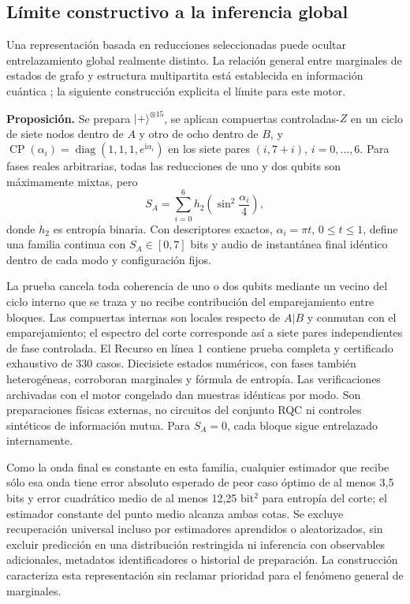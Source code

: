 \documentclass[pdflatex,iicol,sn-basic,Numbered]{sn-jnl}
\begin{document}
\subsection{Límite constructivo a la inferencia global}\label{sec:nogo}
Una representación basada en reducciones seleccionadas puede ocultar entrelazamiento global realmente distinto. La relación general entre marginales de estados de grafo y estructura multipartita está establecida en información cuántica \citep{Hein2004,Vandre2025}; la siguiente construcción explicita el límite para este motor.

\textbf{Proposición.} Se prepara $|+\rangle^{\otimes15}$, se aplican compuertas controladas-$Z$ en un ciclo de siete nodos dentro de $A$ y otro de ocho dentro de $B$, y $\operatorname{CP}(\alpha_i)=\operatorname{diag}(1,1,1,e^{\mathrm i\alpha_i})$ en los siete pares $(i,7+i)$, $i=0,\ldots,6$. Para fases reales arbitrarias, todas las reducciones de uno y dos qubits son máximamente mixtas, pero
\begin{equation}
S_A=\sum_{i=0}^{6}h_2\left(\sin^2\frac{\alpha_i}{4}\right),
\end{equation}
donde $h_2$ es entropía binaria. Con descriptores exactos, $\alpha_i=\pi t$, $0\le t\le1$, define una familia continua con $S_A\in[0,7]$ bits y audio de instantánea final idéntico dentro de cada modo y configuración fijos.

La prueba cancela toda coherencia de uno o dos qubits mediante un vecino del ciclo interno que se traza y no recibe contribución del emparejamiento entre bloques. Las compuertas internas son locales respecto de $A|B$ y conmutan con el emparejamiento; el espectro del corte corresponde así a siete pares independientes de fase controlada. El Recurso en línea 1 contiene prueba completa y certificado exhaustivo de 330 casos. Diecisiete estados numéricos, con fases también heterogéneas, corroboran marginales y fórmula de entropía. Las verificaciones archivadas con el motor congelado dan muestras idénticas por modo. Son preparaciones físicas externas, no circuitos del conjunto RQC ni controles sintéticos de información mutua. Para $S_A=0$, cada bloque sigue entrelazado internamente.

Como la onda final es constante en esta familia, cualquier estimador que recibe sólo esa onda tiene error absoluto esperado de peor caso óptimo de al menos 3,5 bits y error cuadrático medio de al menos 12,25 bit$^2$ para entropía del corte; el estimador constante del punto medio alcanza ambas cotas. Se excluye recuperación universal incluso por estimadores aprendidos o aleatorizados, sin excluir predicción en una distribución restringida ni inferencia con observables adicionales, metadatos identificadores o historial de preparación. La construcción caracteriza esta representación sin reclamar prioridad para el fenómeno general de marginales.
\end{document}
